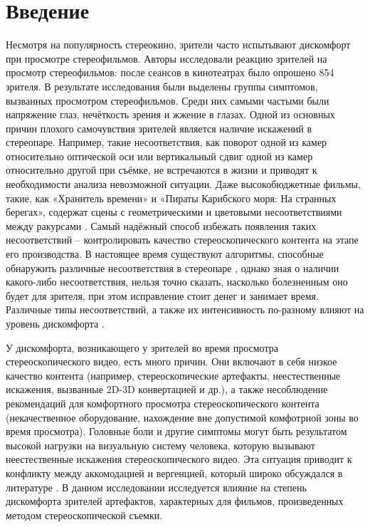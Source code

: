 \section{Введение}
Несмотря на популярность стереокино, зрители часто испытывают дискомфорт при просмотре стереофильмов. Авторы \cite{zeri2015visual} исследовали реакцию зрителей на просмотр стереофильмов: после сеансов в кинотеатрах было опрошено 854 зрителя. В результате исследования были выделены группы симптомов, вызванных просмотром стереофильмов. Среди них самыми частыми были напряжение глаз, нечёткость зрения и жжение в глазах. Одной из основных причин плохого самочувствия зрителей является наличие искажений в стереопаре. Например, такие несоответствия, как поворот одной из камер относительно оптической оси или вертикальный сдвиг одной из камер относительно другой при съёмке, не встречаются в жизни и приводят к необходимости анализа невозможной ситуации. Даже высокобюджетные фильмы, такие, как «Хранитель времени» и «Пираты Карибского моря: На странных берегах», содержат сцены с геометрическими и цветовыми несоответствиями между ракурсами \cite{9report}. Самый надёжный способ избежать появления таких несоответствий – контролировать качество стереоскопического контента на этапе его производства. В настоящее время существуют алгоритмы, способные обнаружить различные несоответствия в стереопаре \cite{voronov2013methodology}, однако зная о наличии какого-либо несоответствия, нельзя точно сказать, насколько болезненным оно будет для зрителя, при этом исправление стоит денег и занимает время. Различные типы несоответствий, а также их интенсивность по-разному влияют на уровень дискомфорта \cite{rozhkova}.

У дискомфорта, возникающего у зрителей во время просмотра стереоскопического видео, есть много причин. Они включают в себя низкое качество контента (например, стереоскопические артефакты, неестественные искажения, вызванные 2D-3D конвертацией и др.), а также несоблюдение рекомендаций для комфортного просмотра стереоскопического контента (некачественное оборудование, нахождение вне допустимой комфотрной зоны во время просмотра). Головные боли и другие симптомы могут быть результатом высокой нагрузки на визуальную систему человека, которую вызывают неестественные искажения стереоскопического видео. Эта ситуация приводит к конфликту между аккомодацией и вергенцией, который широко обсуждался в литературе \cite{lambooij2009visual, terzic2017causes}. В данном исследовании исследуется влияние на степень дискомфорта зрителей артефактов, характерных для фильмов, произведенных методом стереоскопической съемки.